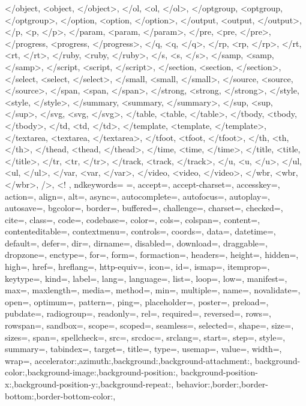 {{    </object, <object, </object>,
    </ol, <ol, </ol>,
    </optgroup, <optgroup, </optgroup>,
    </option, <option, </option>,
    </output, <output, </output>,
    </p, <p, </p>,
    </param, <param, </param>,
    </pre, <pre, </pre>,
    </progress, <progress, </progress>,
    </q, <q, </q>,
    </rp, <rp, </rp>,
    </rt, <rt, </rt>,
    </ruby, <ruby, </ruby>,
    </s, <s, </s>,
    </samp, <samp, </samp>,
    </script, <script, </script>,
    </section, <section, </section>,
    </select, <select, </select>,
    </small, <small, </small>,
    </source, <source, </source>,
    </span, <span, </span>,
    </strong, <strong, </strong>,
    </style, <style, </style>,
    </summary, <summary, </summary>,
    </sup, <sup, </sup>,
    </svg, <svg, </svg>,
    </table, <table, </table>,
    </tbody, <tbody, </tbody>,
    </td, <td, </td>,
    </template, <template, </template>,
    </textarea, <textarea, </textarea>,
    </tfoot, <tfoot, </tfoot>,
    </th, <th, </th>,
    </thead, <thead, </thead>,
    </time, <time, </time>,
    </title, <title, </title>,
    </tr, <tr, </tr>,
    </track, <track, </track>,
    </u, <u, </u>,
    </ul, <ul, </ul>,
    </var, <var, </var>,
    </video, <video, </video>,
    </wbr, <wbr, </wbr>,
    />, <!
    },  
    ndkeywords={
    =,
    accept=, accept-charset=, accesskey=, action=, align=, alt=, async=, autocomplete=, autofocus=, autoplay=, autosave=, bgcolor=, border=, buffered=, challenge=, charset=, checked=, cite=, class=, code=, codebase=, color=, cols=, colspan=, content=, contenteditable=, contextmenu=, controls=, coords=, data=, datetime=, default=, defer=, dir=, dirname=, disabled=, download=, draggable=, dropzone=, enctype=, for=, form=, formaction=, headers=, height=, hidden=, high=, href=, hreflang=, http-equiv=, icon=, id=, ismap=, itemprop=, keytype=, kind=, label=, lang=, language=, list=, loop=, low=, manifest=, max=, maxlength=, media=, method=, min=, multiple=, name=, novalidate=, open=, optimum=, pattern=, ping=, placeholder=, poster=, preload=, pubdate=, radiogroup=, readonly=, rel=, required=, reversed=, rows=, rowspan=, sandbox=, scope=, scoped=, seamless=, selected=, shape=, size=, sizes=, span=, spellcheck=, src=, srcdoc=, srclang=, start=, step=, style=, summary=, tabindex=, target=, title=, type=, usemap=, value=, width=, wrap=,
    accelerator:,azimuth:,background:,background-attachment:,
    background-color:,background-image:,background-position:,
    background-position-x:,background-position-y:,background-repeat:,
    behavior:,border:,border-bottom:,border-bottom-color:,
}}
